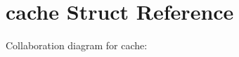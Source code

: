 \hypertarget{structcache}{}\section{cache Struct Reference}
\label{structcache}


Collaboration diagram for cache\+:
